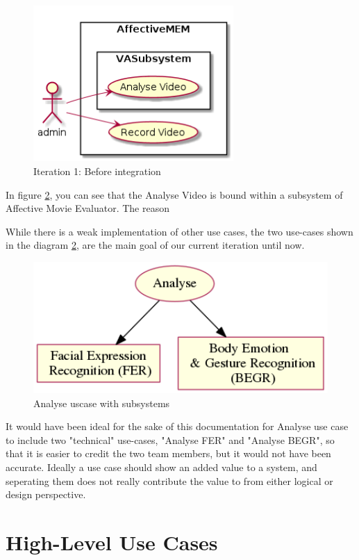 \documentclass[12pt,a4paper,man]{report}
\begin{document}
\begin{figure}[htbp]
\centering
\includegraphics[width=3in]{./img/auc.png}
\caption{\label{fig:auc}
Iteration 1: Before integration}
\end{figure}


In figure \ref{fig:auc}, you can see that the Analyse Video is bound within a subsystem of Affective Movie Evaluator. The reason

While there is a weak implementation of other use cases, the two use-cases shown in the diagram \ref{fig:auc}, are the main goal of our current iteration until now.

\begin{figure}[htbp]
\centering
\includegraphics[width=5in]{./img/auc_exp.png}
\caption{\label{fig:auc}
Analyse uscase with subsystems}
\end{figure}


It would have been ideal for the sake of this documentation for Analyse use case to include two "technical" use-cases, "Analyse FER" and "Analyse BEGR", so that it is easier to credit the two team members, but it would not have been accurate. Ideally a use case should show an added value to a system, and seperating them does not really contribute the value to from either logical or design perspective. 

\section{High-Level Use Cases}
\label{sec:orgb7c82cc}
\end{document}
